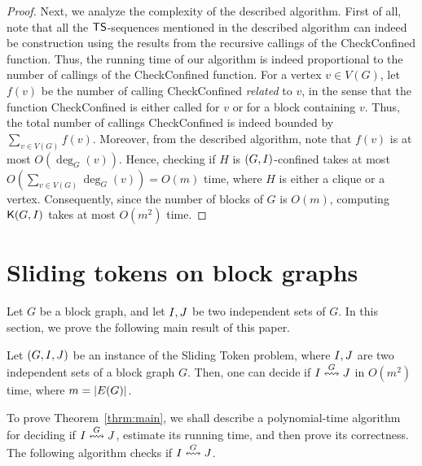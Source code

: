 \documentclass[a4paper]{llncs}
\begin{document}
\begin{proof}
Next, we analyze the complexity of the described algorithm.
First of all, note that all the ${\sf TS}$-sequences mentioned in the described algorithm can indeed be construction using the results from the recursive callings of the {\sc CheckConfined} function.
Thus, the running time of our algorithm is indeed proportional to the number of callings of the {\sc CheckConfined} function.
For a vertex $v \in V(G)$, let $f(v)$ be the number of calling {\sc CheckConfined} \emph{related} to $v$, in the sense that the function {\sc CheckConfined} is either called for $v$ or for a block containing $v$.
Thus, the total number of callings {\sc CheckConfined} is indeed bounded by $\sum_{v \in V(G)}f(v)$.
Moreover, from the described algorithm, note that $f(v)$ is at most $O(\deg_G(v))$.
Hence, checking if $H$ is $(G, I)$-confined takes at most $O(\sum_{v \in V(G)}\deg_G(v)) = O(m)$ time, where $H$ is either a clique or a vertex.
Consequently, since the number of blocks of $G$ is $O(m)$, computing ${\mathsf K}{(G, I)}$ takes at most $O(m^2)$ time.

\end{proof}


\section{Sliding tokens on block graphs}
\label{sec:TS-on-block-graphs}

Let $G$ be a block graph, and let $I, J$ be two independent sets of $G$.
In this section, we prove the following main result of this paper.


\begin{theorem}
\label{thrm:main}
Let $(G, I, J)$ be an instance of the {\sc Sliding Token} problem, where $I, J$ are two independent sets of a block graph $G$.
Then, one can decide if $I \overset{G}{\leftrightsquigarrow} J$ in $O(m^2)$ time, where $m = {\left|E(G)\right|}$.
\end{theorem}


To prove Theorem~\ref{thrm:main}, we shall describe a polynomial-time algorithm for deciding if $I \overset{G}{\leftrightsquigarrow} J$, estimate its running time, and then prove its correctness.
The following algorithm checks if $I \overset{G}{\leftrightsquigarrow} J$.
\end{document}
